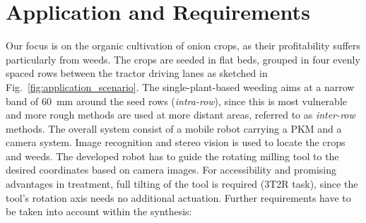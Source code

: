 \documentclass[runningheads,hidelinks]{llncs}
\begin{document}
\section{Application and Requirements} \label{sec:requirements}
Our focus is on the organic cultivation of onion crops, as their profitability suffers particularly from weeds. 
The crops are seeded in flat beds, grouped in four evenly spaced rows between the tractor driving lanes as sketched in Fig.~\ref{fig:application_scenario}. The single-plant-based weeding aims at a narrow band of \SI{60}{\milli\metre} around the seed rows (\emph{intra-row}), since this is most vulnerable and more rough methods are used at more distant areas, referred to as \emph{inter-row} methods. 
%
The overall system consist of a mobile robot carrying a PKM and a camera system. 
Image recognition and stereo vision is used to locate the crops and weeds.
The developed robot has to guide the rotating milling tool to the desired coordinates based on camera images. 
For accessibility and promising advantages in treatment, full tilting of the tool is required (3T2R task), since the tool's rotation axis needs no additional actuation. 
% 
% 
Further requirements have to be taken into account within the synthesis:
\end{document}
